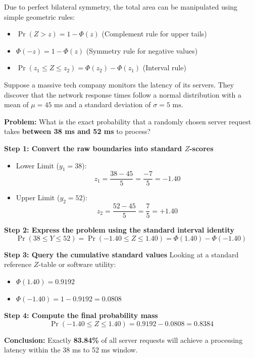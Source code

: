 \documentclass{article}
\begin{document}
Due to perfect bilateral symmetry, the total area can be manipulated using simple geometric rules:
\begin{itemize}
    \item $\Pr(Z > z) = 1 - \Phi(z)$ \quad (Complement rule for upper tails)
    \item $\Phi(-z) = 1 - \Phi(z)$ \quad (Symmetry rule for negative values)
    \item $\Pr(z_1 \le Z \le z_2) = \Phi(z_2) - \Phi(z_1)$ \quad (Interval rule)
\end{itemize}

\begin{tcolorbox}[colback=red!5!white, colframe=red!60!black, title=Step-by-Step Numerical Case Study]
Suppose a massive tech company monitors the latency of its servers. They discover that the network response times follow a normal distribution with a mean of $\mu = 45\text{ ms}$ and a standard deviation of $\sigma = 5\text{ ms}$. 

\textbf{Problem:} What is the exact probability that a randomly chosen server request takes \textbf{between 38 ms and 52 ms} to process?

\noindent \textbf{Step 1: Convert the raw boundaries into standard $Z$-scores}
\begin{itemize}
    \item Lower Limit ($y_1 = 38$):
    \begin{equation*}
        z_1 = \frac{38 - 45}{5} = \frac{-7}{5} = \mathbf{-1.40}
    \end{equation*}
    \item Upper Limit ($y_2 = 52$):
    \begin{equation*}
        z_2 = \frac{52 - 45}{5} = \frac{7}{5} = \mathbf{+1.40}
    \end{equation*}
\end{itemize}

\noindent \textbf{Step 2: Express the problem using the standard interval identity}
\begin{equation*}
    \Pr(38 \le Y \le 52) = \Pr(-1.40 \le Z \le 1.40) = \Phi(1.40) - \Phi(-1.40)
\end{equation*}

\noindent \textbf{Step 3: Query the cumulative standard values}
Looking at a standard reference $Z$-table or software utility:
\begin{itemize}
    \item $\Phi(1.40) = 0.9192$
    \item $\Phi(-1.40) = 1 - 0.9192 = 0.0808$
\end{itemize}

\noindent \textbf{Step 4: Compute the final probability mass}
\begin{equation*}
    \Pr(-1.40 \le Z \le 1.40) = 0.9192 - 0.0808 = \mathbf{0.8384}
\end{equation*}

\textbf{Conclusion:} Exactly \textbf{83.84\%} of all server requests will achieve a processing latency within the 38 ms to 52 ms window.
\end{tcolorbox}
\end{document}
